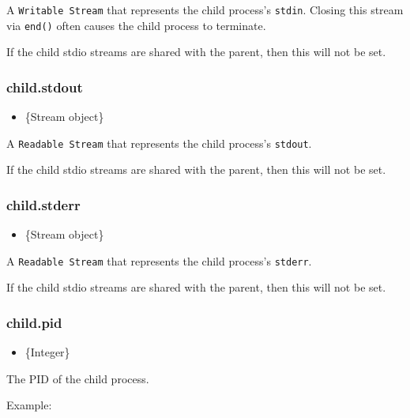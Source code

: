 A \texttt{Writable Stream} that represents the child process's
\texttt{stdin}. Closing this stream via \texttt{end()} often causes the
child process to terminate.

If the child stdio streams are shared with the parent, then this will
not be set.

\subsubsection{child.stdout}

\begin{itemize}
\item
  \{Stream object\}
\end{itemize}

A \texttt{Readable Stream} that represents the child process's
\texttt{stdout}.

If the child stdio streams are shared with the parent, then this will
not be set.

\subsubsection{child.stderr}

\begin{itemize}
\item
  \{Stream object\}
\end{itemize}

A \texttt{Readable Stream} that represents the child process's
\texttt{stderr}.

If the child stdio streams are shared with the parent, then this will
not be set.

\subsubsection{child.pid}

\begin{itemize}
\item
  \{Integer\}
\end{itemize}

The PID of the child process.

Example:

\begin{Shaded}
\begin{Highlighting}[]
 \NormalTok{,}
    \NormalTok{, [}\NormalTok{]);}

\NormalTok{(} \NormalTok{+ }\NormalTok{);}
\NormalTok{();}
\end{Highlighting}
\end{Shaded}

